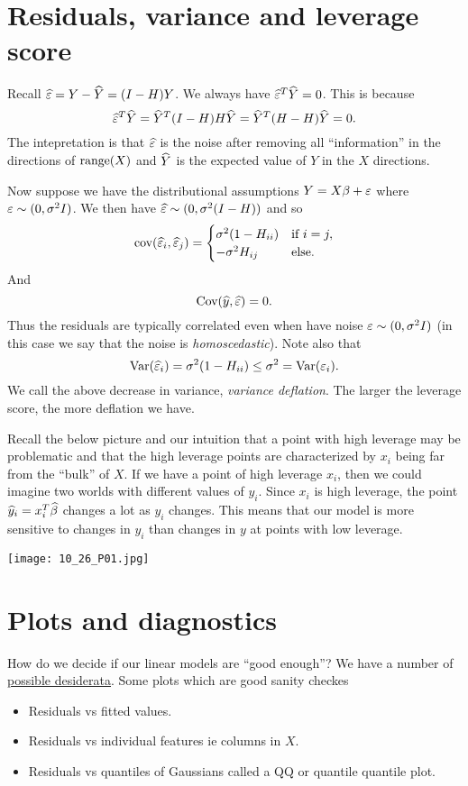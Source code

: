 \section{Residuals, variance and leverage score}
Recall $\widehat{\varepsilon} = Y-\widehat{Y} = (I-H)Y$. We always have $\widehat{\varepsilon}^T\widehat{Y}=0$. This is because
\[\widehat{\varepsilon}^T\widehat{Y} = \widehat{Y}^T(I-H)H\widehat{Y} = \widehat{Y}^T(H-H)\widehat{Y}=0. \]
The intepretation is that $\widehat{\varepsilon}$ is the noise after removing all ``information'' in the directions of $\operatorname{range}(X)$ and $\widehat{Y}$ is the expected value of $Y$ in the $X$ directions.

Now suppose we have the distributional assumptions $Y=X\beta+\varepsilon$ where $\varepsilon \sim (0,\sigma^2I)$. We then have $\widehat{\varepsilon} \sim (0,\sigma^2(I-H))$ and so
\[\text{cov}(\widehat{\varepsilon}_i,\widehat{\varepsilon}_j) = \begin{cases}
    \sigma^2(1-H_{ii}) & \text{if } i=j,\\
    -\sigma^2H_{ij} & \text{else}.
\end{cases} \]
And
\[\text{Cov}(\widehat{y},\widehat{\varepsilon}) = 0.\] 
Thus the residuals are typically correlated even when have noise $\varepsilon \sim (0,\sigma^2 I)$ (in this case we say that the noise is \emph{homoscedastic}). Note also that
\[\operatorname{Var}(\widehat{\varepsilon}_i) = \sigma^2(1-H_{ii}) \le \sigma^2 = \operatorname{Var}(\varepsilon_i). \]
We call the above decrease in variance, \emph{variance deflation}. The larger the leverage score, the more deflation we have. 

Recall the below picture and our intuition that a point with high leverage may be problematic and that the high leverage points are characterized by $x_{i}$ being far from the ``bulk'' of $X$. If we have a point of high leverage $x_i$, then we could imagine two worlds with different values of $y_i$. Since $x_i$ is high leverage, the point $\widehat{y}_i = x_i^T \widehat{\beta}$ changes a lot as $y_i$ changes. This means that our model is more sensitive to changes in $y_i$ than changes in $y$ at points with low leverage.

\begin{center}
    \texttt{[image: 10\_26\_P01.jpg]}
\end{center}

\section{Plots and diagnostics}
How do we decide if our linear models are ``good enough''? We have a number of \underline{possible desiderata}. Some plots which are good sanity checkes
\begin{itemize}
    \item Residuals vs fitted values.
    \item Residuals vs individual features ie columns in $X$.
    \item Residuals vs quantiles of Gaussians called a QQ or quantile quantile plot.
\end{itemize}

